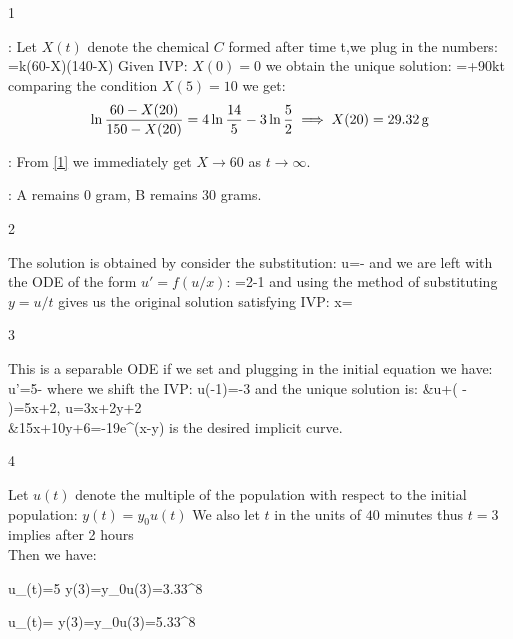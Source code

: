 

\begin{vv286_ms}{1}
\item[(i)]:
Let $X(t)$ denote the chemical $C$ formed after time t,we plug in the numbers:
\eq
{
=k(60-X)(140-X)
}
Given IVP: $X(0)=0$ we obtain the unique solution:
\eq
{
\sin{}=\ln{}+90kt
}
comparing the condition $X(5)=10$ we get:
\[
\ln\frac{60-X(20)}{150-X(20)}=4\ln\frac{14}{5}-3\ln\frac{5}{2}\implies X(20)=29.32\,{\rm g}
\]
\item[(ii)]:
From \eqref{1} we immediately get $X\to60$ as $t\to\infty$.
\item[(iii)]:
A remains 0 gram, B remains 30 grams.
\end{vv286_ms}


\begin{vv286_ms}{2}
\item[]
The solution is obtained by consider the substitution: 
\eq
{
u=-
}
and we are left with the ODE of the form $u'=f(u/x)$:
\eq
{
=2-1
}
and using the method of substituting $y=u/t$ gives us the original solution  satisfying IVP:
\eq
{
x=
}
\end{vv286_ms}


\begin{vv286_ms}{3}
\item[]
This is a separable ODE if we set
and plugging in the initial equation we have:
\eq
{
u'=5-
}
where we shift the IVP:
\eq
{
u(-1)=-3
}
and the unique solution is:
\eq
{
&u+\left( - \right)=5x+2,
\quad
u=3x+2y+2\\
\implies\quad &15x+10y+6=-19e^{(x-y)}
}
is the desired implicit curve.
\end{vv286_ms}


\begin{vv286_ms}{4}
\item[]
Let $u(t)$ denote the multiple of the population with
respect to the initial population: $y(t)=y_0u(t)$
We also let $t$ in the units of $40$ minutes thus $t=3$
implies after 2 hours\\
Then we have:
\item[(a)]
	\eq
	{
	u_{\gamma}(t)=5\implies
	y(3)=y_0u(3)=3.33^8
	}
\item[(b)]
	\eq
	{
	u_{\gamma}(t)=\implies
	y(3)=y_0u(3)=5.33^8
	}
\end{vv286_ms}


